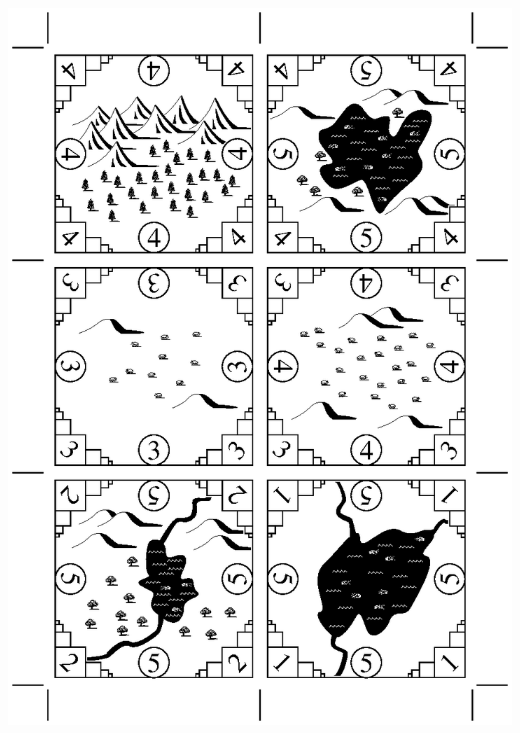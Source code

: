 \documentclass[12pt]{article}
\begin{document}
\begin{center}
\includegraphics[width=7in]{tile_sheet_5.eps}

\vfill

\newpage


\end{center}
\end{document}
